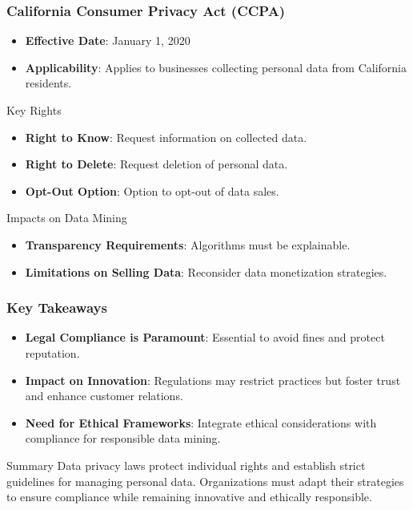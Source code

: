 \documentclass[aspectratio=169]{beamer}
\begin{document}
\begin{frame}[fragile]
    \frametitle{California Consumer Privacy Act (CCPA)}
    \begin{itemize}
        \item \textbf{Effective Date}: January 1, 2020
        \item \textbf{Applicability}: Applies to businesses collecting personal data from California residents.
    \end{itemize}
    \begin{block}{Key Rights}
        \begin{itemize}
            \item \textbf{Right to Know}: Request information on collected data.
            \item \textbf{Right to Delete}: Request deletion of personal data.
            \item \textbf{Opt-Out Option}: Option to opt-out of data sales.
        \end{itemize}
    \end{block}
    \begin{block}{Impacts on Data Mining}
        \begin{itemize}
            \item \textbf{Transparency Requirements}: Algorithms must be explainable.
            \item \textbf{Limitations on Selling Data}: Reconsider data monetization strategies.
        \end{itemize}
    \end{block}
\end{frame}

\begin{frame}[fragile]
    \frametitle{Key Takeaways}
    \begin{itemize}
        \item \textbf{Legal Compliance is Paramount}: Essential to avoid fines and protect reputation.
        \item \textbf{Impact on Innovation}: Regulations may restrict practices but foster trust and enhance customer relations.
        \item \textbf{Need for Ethical Frameworks}: Integrate ethical considerations with compliance for responsible data mining.
    \end{itemize}
    \begin{block}{Summary}
        Data privacy laws protect individual rights and establish strict guidelines for managing personal data. Organizations must adapt their strategies to ensure compliance while remaining innovative and ethically responsible.
    \end{block}
\end{frame}
\end{document}
